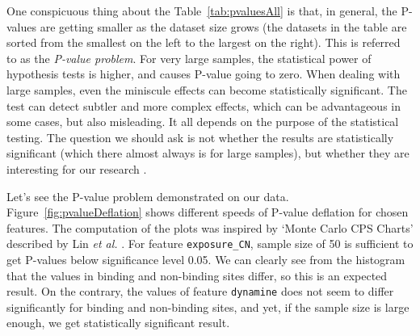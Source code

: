 One conspicuous thing about the Table~\ref{tab:pvaluesAll} is that, in general, the P-values are getting smaller as the dataset size grows (the datasets in the table are sorted from the smallest on the left to the largest on the right). This is referred to as the \textit{P-value problem}. For very large samples, the statistical power of hypothesis tests is higher, and causes P-value going to zero. When dealing with large samples, even the miniscule effects can become statistically significant. The test can detect subtler and more complex effects, which can be advantageous in some cases, but also misleading. It all depends on the purpose of the statistical testing. The question we should ask is not whether the results are statistically significant (which there almost always is for large samples), but whether they are interesting for our research \cite{pvalueproblem}.

Let's see the P-value problem demonstrated on our data. Figure~\ref{fig:pvalueDeflation} shows different speeds of P-value deflation for chosen features. The computation of the plots was inspired by `Monte Carlo CPS Charts' described by Lin \textit{et al.} \cite{pvalueproblem}. For feature \texttt{exposure\_CN}, sample size of 50 is sufficient to get P-values below significance level 0.05. We can clearly see from the histogram that the values in binding and non-binding sites differ, so this is an expected result. On the contrary, the values of feature \texttt{dynamine} does not seem to differ significantly for binding and non-binding sites, and yet, if the sample size is large enough, we get statistically significant result.


